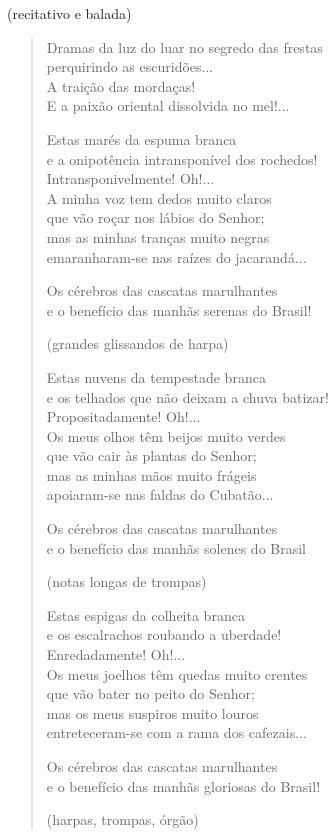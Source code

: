 \begin{flushright}
(recitativo e balada)
\end{flushright}

\begin{verse}
Dramas da luz do luar no segredo das frestas\\
perquirindo as escuridões...\\
A traição das mordaças!\\
E a paixão oriental dissolvida no mel!...

Estas marés da espuma branca\\
e a onipotência intransponível dos rochedos!\\
Intransponivelmente! Oh!...\\
A minha voz tem dedos muito claros\\
que vão roçar nos lábios do Senhor;\\
mas as minhas tranças muito negras\\
emaranharam-se nas raízes do jacarandá...

Os cérebros das cascatas marulhantes\\
e o benefício das manhãs serenas do Brasil!

\hfill{}(grandes glissandos de harpa)

Estas nuvens da tempestade branca\\
e os telhados que não deixam a chuva batizar!\\
Propositadamente! Oh!...\\
Os meus olhos têm beijos muito verdes\\
que vão cair às plantas do Senhor;\\
mas as minhas mãos muito frágeis\\
apoiaram-se nas faldas do Cubatão...

Os cérebros das cascatas marulhantes\\
e o benefício das manhãs solenes do Brasil

\hfill{}(notas longas de trompas)

Estas espigas da colheita branca\\
e os escalrachos roubando a uberdade!\\
Enredadamente! Oh!...\\
Os meus joelhos têm quedas muito crentes\\
que vão bater no peito do Senhor;\\
mas os meus suspiros muito louros\\
entreteceram-se com a rama dos cafezais...

Os cérebros das cascatas marulhantes\\
e o benefício das manhãs gloriosas do Brasil!

\hfill{}(harpas, trompas, órgão)
\end{verse}

